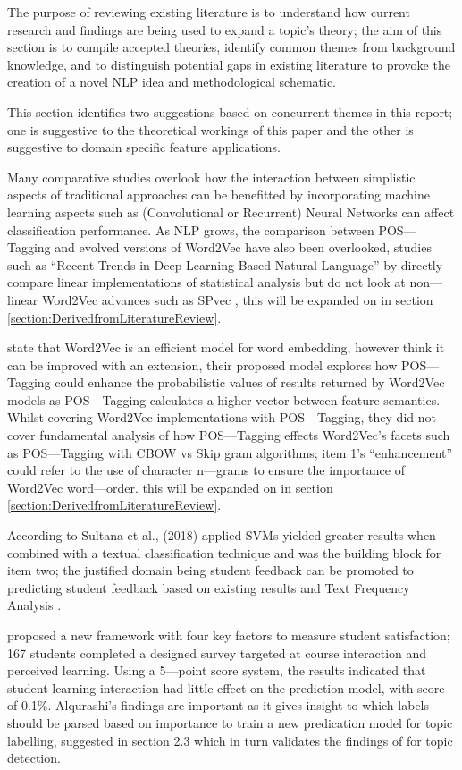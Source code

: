 The purpose of reviewing existing literature is to understand how current research and findings are being used to expand a topic’s theory; the aim of this section is to compile accepted theories, identify common themes from background knowledge, and to distinguish potential gaps in existing literature to provoke the creation of a novel NLP idea and methodological schematic.

This section identifies two suggestions based on concurrent themes in this report; one is suggestive to the theoretical workings of this paper and the other is suggestive to domain specific feature applications.

Many comparative studies overlook how the interaction between simplistic aspects of traditional approaches can be benefitted by incorporating machine learning aspects such as (Convolutional or Recurrent) Neural Networks can affect classification performance. As NLP grows, the comparison between POS---Tagging and evolved versions of Word2Vec have also been overlooked, studies such as “Recent Trends in Deep Learning Based Natural Language” by \parencite{young2018recent} directly compare linear implementations of statistical analysis but do not look at non---linear Word2Vec advances such as SPvec \parencite{zhang2020spvec}, this will be expanded on in section \ref{section:DerivedfromLiteratureReview}.

\textcite{suleiman2019using} state that Word2Vec is an efficient model for word embedding, however think it can be improved with an extension, their proposed model explores how POS---Tagging could enhance the probabilistic values of results returned by Word2Vec models as POS---Tagging calculates a higher vector between feature semantics. Whilst covering Word2Vec implementations with POS---Tagging, they did not cover fundamental analysis of how POS---Tagging effects Word2Vec’s facets such as POS---Tagging with CBOW vs Skip gram algorithms; item 1’s “enhancement” could refer to the use of character n---grams to ensure the importance of Word2Vec word---order. this will be expanded on in section \ref{section:DerivedfromLiteratureReview}.

According to Sultana et al., (2018) applied SVMs yielded greater results when combined with a textual classification technique and was the building block for item two; the justified domain being student feedback can be promoted to predicting student feedback based on existing results and Text Frequency Analysis \parencite{alqurashi2019predicting}.

\textcite{alqurashi2019predicting} proposed a new framework with four key factors to measure student satisfaction; 167 students completed a designed survey targeted at course interaction and perceived learning. Using a 5---point score system, the results indicated that student learning interaction had little effect on the prediction model, with score of 0.1\%. Alqurashi’s findings are important as it gives insight to which labels should be parsed based on importance to train a new predication model for topic labelling, suggested in section 2.3 which in turn validates the findings of \parencite{unankard2019topic} for topic detection.
